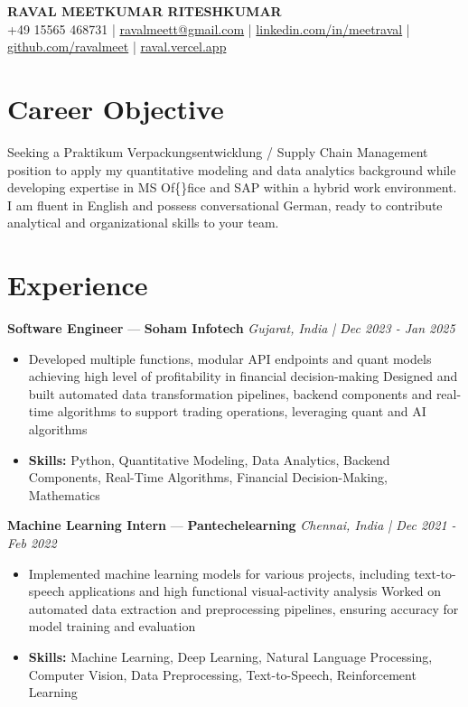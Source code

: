 \documentclass[a4paper,10pt]{article}
\begin{document}
\begin{center}
  {\Large\bfseries RAVAL MEETKUMAR RITESHKUMAR}\\[2pt]
  {\small +49 15565 468731 \;|\; \href{mailto:ravalmeett@gmail.com}{ravalmeett@gmail.com} \;|\; \href{https://www.linkedin.com/in/meetraval/}{linkedin.com/in/meetraval} \;|\; \href{https://github.com/ravalmeet}{github.com/ravalmeet} \;|\; \href{https://raval.vercel.app/}{raval.vercel.app}}
\end{center}
\vspace{-3pt}

\section*{Career Objective}
Seeking a Praktikum Verpackungsentwicklung / Supply Chain Management position to apply my quantitative modeling and data analytics background while developing expertise in MS Of\{\}fice and SAP within a hybrid work environment. I am fluent in English and possess conversational German, ready to contribute analytical and organizational skills to your team.\par

\section*{Experience}
\textbf{Software Engineer} — \textbf{Soham Infotech} \hfill \textit{Gujarat, India \;|\; Dec 2023 - Jan 2025}\par
\vspace{1pt}
\begin{itemize}
  \item Developed multiple functions, modular API endpoints and quant models achieving high level of profitability in financial decision-making Designed and built automated data transformation pipelines, backend components and real-time algorithms to support trading operations, leveraging quant and AI algorithms
  \item \textbf{Skills:} Python, Quantitative Modeling, Data Analytics, Backend Components, Real-Time Algorithms, Financial Decision-Making, Mathematics
\end{itemize}
\vspace{3pt}
\textbf{Machine Learning Intern} — \textbf{Pantechelearning} \hfill \textit{Chennai, India \;|\; Dec 2021 - Feb 2022}\par
\vspace{1pt}
\begin{itemize}
  \item Implemented machine learning models for various projects, including text-to-speech applications and high functional visual-activity analysis Worked on automated data extraction and preprocessing pipelines, ensuring accuracy for model training and evaluation
  \item \textbf{Skills:} Machine Learning, Deep Learning, Natural Language Processing, Computer Vision, Data Preprocessing, Text-to-Speech, Reinforcement Learning
\end{itemize}
\end{document}
